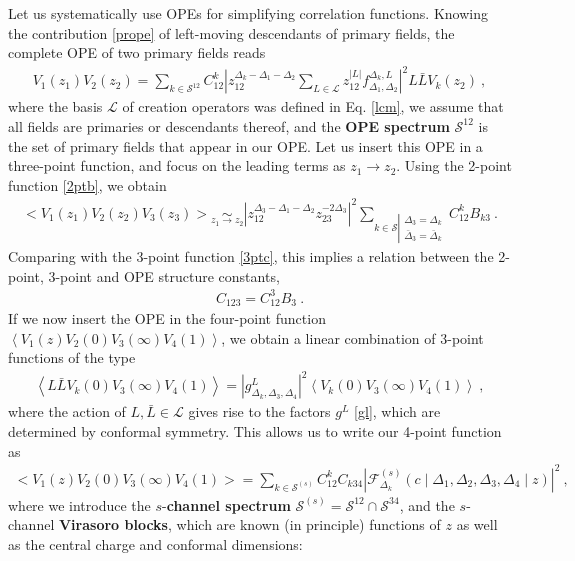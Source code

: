 \documentclass[12pt, a4paper]{article}
\newcommand{\myindex}[1]{\textbf{\boldmath #1}}
\theoremstyle{break}
\begin{document}
Let us systematically use OPEs for simplifying correlation functions. Knowing the contribution \eqref{prope} of left-moving descendants of primary fields, the complete OPE of two primary fields reads 
\begin{align}
 V_1(z_1)V_2(z_2) = \sum_{k\in\mathcal{S}^{12}} C_{12}^k \left|z_{12}^{\Delta_k-\Delta_1-\Delta_2}\sum_{L\in\mathcal{L}} z_{12}^{|L|}f_{\Delta_1,\Delta_2}^{\Delta_k,L}\right|^2 L\bar L V_k(z_2)\ ,
 \label{tope}
\end{align}
where the basis $\mathcal{L}$ of creation operators was defined in Eq. \eqref{lcm},
we assume that all fields are primaries or descendants thereof, and the \myindex{OPE spectrum} $\mathcal{S}^{12}$ is the set of primary fields that appear in our OPE. Let us insert this OPE in a three-point function, and focus on the leading terms as $z_1\to z_2$. Using the 2-point function \eqref{2ptb}, we obtain
\begin{align}
  \Big< V_1(z_1)V_2(z_2)V_3(z_3) \Big> \underset{z_1\to z_2}{\sim} 
  \left|z_{12}^{\Delta_3-\Delta_1-\Delta_2}z_{23}^{-2\Delta_3}\right|^2 
  \sum_{k\in\mathcal{S}\left|\substack{\Delta_3=\Delta_k\\ \bar{\Delta}_3=\bar\Delta_k}\right. }
  C_{12}^k B_{k3}\ .
\end{align}
Comparing with the 3-point function \eqref{3ptc}, this implies a relation between the 2-point, 3-point and OPE structure constants,
\begin{align}
 \boxed{C_{123} = C_{12}^3B_{3}} \ .
 \label{ccb}
\end{align}
If we now insert the OPE in the four-point function $\left<V_1(z)V_2(0)V_3(\infty)V_4(1)\right>$, we obtain a linear combination of 3-point functions of the type 
\begin{align}
 \left<L\bar{L}V_k(0) V_3(\infty)V_4(1)\right> = \left|g^L_{\Delta_k,\Delta_3,\Delta_4}\right|^2 \left<V_k(0) V_3(\infty)V_4(1)\right>\ ,
\end{align}
where the action of $L,\bar L\in\mathcal{L}$ gives rise to the factors $g^L$ \eqref{gl}, which are determined by conformal symmetry. 
This allows us to write our 4-point function as 
\begin{align}
 \boxed{\Big<V_1(z)V_2(0)V_3(\infty)V_4(1)\Big> = \sum_{k\in\mathcal{S}^{(s)}} C_{12}^k C_{k34} \left|\mathcal{F}^{(s)}_{\Delta_k}\left(c\middle|\Delta_1,\Delta_2,\Delta_3,\Delta_4\middle|z\right)\right|^2}  \ ,
 \label{sdec}
\end{align}
where we introduce the $s$-\myindex{channel spectrum} $\mathcal{S}^{(s)}= \mathcal{S}^{12}\cap \mathcal{S}^{34}$, and the $s$-channel \myindex{Virasoro blocks}, which are known (in principle) functions of $z$ as well as the central charge and conformal dimensions:
\end{document}
